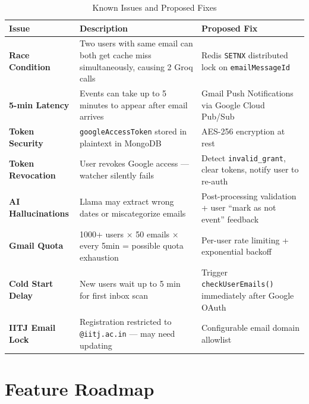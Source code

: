 \documentclass[12pt,a4paper]{report}
\begin{document}
\begin{table}[H]
\centering
{}
\begin{tabularx}{\textwidth}{>{\bfseries}l X X}
\rowcolor{tableheadbg}
\color{white}Issue & \color{white}Description & \color{white}Proposed Fix \\
\toprule
Race Condition     & Two users with same email can both get cache miss simultaneously, causing 2 Groq calls & Redis \texttt{SETNX} distributed lock on \texttt{emailMessageId} \\
5-min Latency      & Events can take up to 5 minutes to appear after email arrives & Gmail Push Notifications via Google Cloud Pub/Sub \\
Token Security     & \texttt{googleAccessToken} stored in plaintext in MongoDB & AES-256 encryption at rest \\
Token Revocation   & User revokes Google access — watcher silently fails & Detect \texttt{invalid\_grant}, clear tokens, notify user to re-auth \\
AI Hallucinations  & Llama may extract wrong dates or miscategorize emails & Post-processing validation + user ``mark as not event'' feedback \\
Gmail Quota        & 1000+ users × 50 emails × every 5min = possible quota exhaustion & Per-user rate limiting + exponential backoff \\
Cold Start Delay   & New users wait up to 5 min for first inbox scan & Trigger \texttt{checkUserEmails()} immediately after Google OAuth \\
IITJ Email Lock    & Registration restricted to \texttt{@iitj.ac.in} — may need updating & Configurable email domain allowlist \\
\bottomrule
\end{tabularx}
\caption{Known Issues and Proposed Fixes}
\end{table}

\section{Feature Roadmap}
\end{document}
